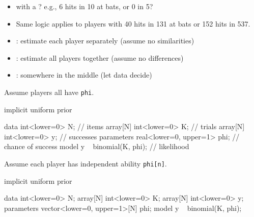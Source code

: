 \documentclass[10pt]{report}
\begin{document}
%
\begin{itemize}
\item {} with a ? 
  e.g., 6 hits in 10 at bats, or 0 in 5?
\item Same logic applies to players with 40 hits in 131 at bats or 152 hits in 537.
\item {}: estimate each player separately (assume no similarities)
\item {}: estimate all players together (assume no differences)
\item {}: somewhere in the middle (let data decide)
\end{itemize}


%
\begin{subitemize}
\item Assume players all have  \texttt{phi}.
  \begin{subitemize}
  \item implicit uniform prior 
  \end{subitemize}
\begin{stancode}
data {
  int<lower=0> N;              // items
  array[N] int<lower=0> K;     // trials
  array[N] int<lower=0> y;     // successes
}
parameters {
  real<lower=0, upper=1> phi;  // chance of success
}
model {
  y ~ binomial(K, phi);        // likelihood
}
\end{stancode}
\end{subitemize}


%
\begin{subitemize}
\item Assume each player has independent ability \texttt{phi[n]}.
  \begin{subitemize}
  \item implicit uniform prior 
  \end{subitemize}
\begin{stancode}
data {
  int<lower=0> N;
  array[N] int<lower=0> K;
  array[N] int<lower=0> y;
}
parameters {
  vector<lower=0, upper=1>[N] phi;
}
model {
  y ~ binomial(K, phi);
}
\end{stancode}
\end{subitemize}
\end{document}
